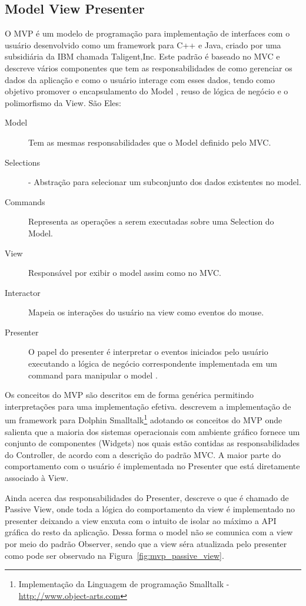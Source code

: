 \documentclass[conference]{IEEEtran}
\begin{document}
\subsection{Model View Presenter}

O MVP é um modelo de programação para implementação de interfaces com o usuário
desenvolvido como um framework para C++ e Java, criado por uma subsidiária da
IBM chamada Taligent,Inc. Este padrão é baseado no MVC e descreve vários
componentes que tem as responsabilidades de como gerenciar os dados da aplicação
e como o usuário interage com esses dados, tendo como objetivo promover o
encapsulamento do Model , reuso de lógica de negócio e o polimorfismo da View.
São Eles:

\begin{description}
  \item[Model] Tem as mesmas responsabilidades que o Model definido pelo MVC.
  \item[Selections] - Abstração para selecionar um subconjunto dos dados
  existentes no model.
  \item [Commands] Representa as operações a serem executadas sobre uma
  Selection do Model.
  \item [View] Responsável por exibir o model assim como no MVC.
  \item [Interactor] Mapeia os interações do usuário na view como eventos do
  mouse.
  \item [Presenter] O papel do presenter é interpretar o eventos iniciados pelo
  usuário executando a lógica de negócio correspondente implementada em um
  command para manipular o model \cite{Potel96mvp}.
\end{description}


Os conceitos do MVP são descritos em  de forma genérica
permitindo interpretações para uma implementação efetiva.
 descrevem a implementação de um framework para
Dolphin Smalltalk\footnote{Implementação da Linguagem de programação Smalltalk - 
\url{http://www.object-arts.com}} adotando os conceitos do MVP onde salienta que
a maioria dos sistemas operacionais com ambiente gráfico fornece um conjunto de
componentes (Widgets) nos quais estão contidas as responsabilidades do
Controller, de acordo com a descrição do padrão MVC. A maior parte do
comportamento com o usuário é implementada no Presenter que está
diretamente associado à View.

Ainda acerca das responsabilidades do Presenter,  descreve
o que é chamado de Passive View, onde toda a lógica do comportamento da view é
implementado no presenter deixando a view enxuta com o intuito de isolar ao
máximo a API gráfica do resto da aplicação. Dessa forma o model não se comunica
com a view por meio do padrão Observer, sendo que a view séra atualizada
pelo presenter como pode ser observado na Figura~\ref{fig:mvp_passive_view}.
\end{document}
